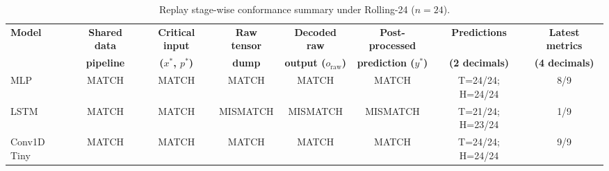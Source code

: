 \begin{table}[!t]
\centering
\caption{Replay stage-wise conformance summary under Rolling-24 ($n{=}24$).}
\label{tab:equiv}
\scriptsize
\setlength{\tabcolsep}{4pt}
\renewcommand{\arraystretch}{1.08}
\begin{tabular}{lccccccc}
\toprule
\textbf{Model} & \textbf{Shared data} & \textbf{Critical input} & \textbf{Raw tensor} & \textbf{Decoded raw} & \textbf{Post-processed} & \textbf{Predictions} & \textbf{Latest metrics} \\
 & \textbf{pipeline} & \textbf{($x^*$, $p^*$)} & \textbf{dump} & \textbf{output ($o_{\mathrm{raw}}$)} & \textbf{prediction ($y^*$)} & \textbf{(2 decimals)} & \textbf{(4 decimals)} \\
\midrule
MLP & MATCH & MATCH & MATCH & MATCH & MATCH & T=24/24; H=24/24 & 8/9 \\
LSTM & MATCH & MATCH & MISMATCH & MISMATCH & MISMATCH & T=21/24; H=23/24 & 1/9 \\
Conv1D Tiny & MATCH & MATCH & MATCH & MATCH & MATCH & T=24/24; H=24/24 & 9/9 \\
\bottomrule
\end{tabular}
\end{table}

